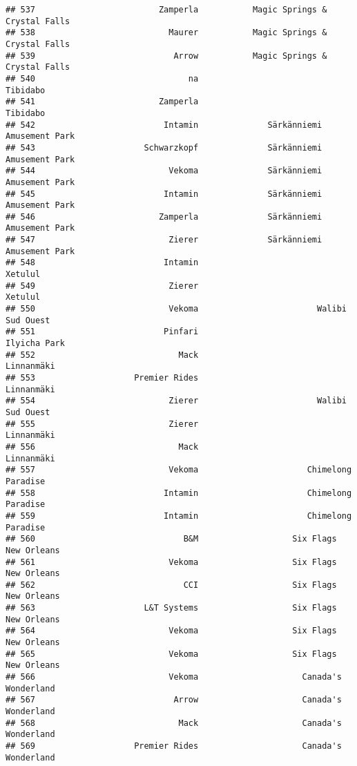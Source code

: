 \documentclass[
]{article}
\begin{document}
\begin{verbatim}
## 537                         Zamperla           Magic Springs & Crystal Falls
## 538                           Maurer           Magic Springs & Crystal Falls
## 539                            Arrow           Magic Springs & Crystal Falls
## 540                               na                                Tibidabo
## 541                         Zamperla                                Tibidabo
## 542                          Intamin              Särkänniemi Amusement Park
## 543                      Schwarzkopf              Särkänniemi Amusement Park
## 544                           Vekoma              Särkänniemi Amusement Park
## 545                          Intamin              Särkänniemi Amusement Park
## 546                         Zamperla              Särkänniemi Amusement Park
## 547                           Zierer              Särkänniemi Amusement Park
## 548                          Intamin                                 Xetulul
## 549                           Zierer                                 Xetulul
## 550                           Vekoma                        Walibi Sud Ouest
## 551                          Pinfari                            Ilyicha Park
## 552                             Mack                              Linnanmäki
## 553                    Premier Rides                              Linnanmäki
## 554                           Zierer                        Walibi Sud Ouest
## 555                           Zierer                              Linnanmäki
## 556                             Mack                              Linnanmäki
## 557                           Vekoma                      Chimelong Paradise
## 558                          Intamin                      Chimelong Paradise
## 559                          Intamin                      Chimelong Paradise
## 560                              B&M                   Six Flags New Orleans
## 561                           Vekoma                   Six Flags New Orleans
## 562                              CCI                   Six Flags New Orleans
## 563                      L&T Systems                   Six Flags New Orleans
## 564                           Vekoma                   Six Flags New Orleans
## 565                           Vekoma                   Six Flags New Orleans
## 566                           Vekoma                     Canada's Wonderland
## 567                            Arrow                     Canada's Wonderland
## 568                             Mack                     Canada's Wonderland
## 569                    Premier Rides                     Canada's Wonderland

\end{verbatim}
\end{document}

